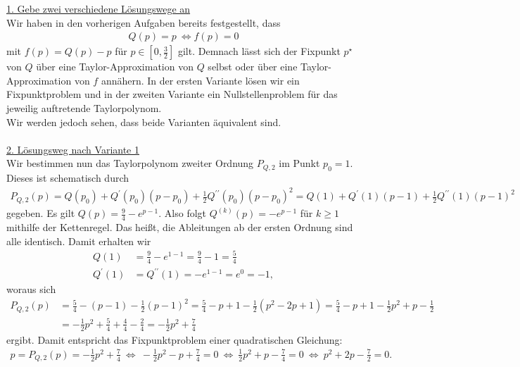 \underline{1. Gebe zwei verschiedene Lösungswege an}\\
Wir haben in den vorherigen Aufgaben bereits festgestellt, dass
\begin{align*}
	Q(p) = p \ \Leftrightarrow f(p) = 0
\end{align*}
mit $ f(p) = Q(p) - p  $ für $ p \in \left[0,\frac{3}{2}\right]   $ gilt.
Demnach lässt sich der Fixpunkt $ p^\star $ von $ Q $ über eine Taylor-Approximation von $ Q $  selbst oder über eine Taylor-Approximation von $ f $
annähern.
In der ersten Variante lösen wir ein Fixpunktproblem und in der zweiten Variante ein Nullstellenproblem für das jeweilig auftretende Taylorpolynom.\\
Wir werden jedoch sehen, dass beide Varianten äquivalent sind.\\
\\
\underline{2. Lösungsweg nach Variante 1}\\
Wir bestimmen nun das Taylorpolynom zweiter Ordnung $ P_{Q,2} $ im Punkt $ p_0 = 1 $.
Dieses ist schematisch durch
\begin{align*}
	P_{Q,2}(p)
	=
	Q(p_0) + Q^\prime(p_0)(p -p_0) + \frac{1}{2}Q^{\prime \prime}(p_0)(p-p_0)^2
	=
	Q(1)+ Q^\prime(1)(p -1) + \frac{1}{2}Q^{\prime \prime}(1)(p-1)^2
\end{align*}
gegeben. Es gilt $ Q(p) = \frac{9}{4} - e^{p-1} $.
Also folgt $ Q^{(k)}(p) = -e^{p-1} $ für $ k \geq 1 $ mithilfe der Kettenregel.
Das heißt, die Ableitungen ab der ersten Ordnung sind alle identisch.
Damit erhalten wir
\begin{align*}
	Q(1) &= \frac{9}{4} - e^{1-1} = \frac{9}{4} - 1 = \frac{5}{4}\\
	Q^\prime(1) &= Q^{\prime \prime}(1) =-  e^{1-1 } = e^0 =  - 1,
\end{align*}
woraus sich
\begin{align*}
	P_{Q,2}(p)
	&=
	\frac{5}{4} - (p - 1) - \frac{1}{2} (p - 1)^2 
	=
	\frac{5}{4} - p + 1 -\frac{1}{2}(p^2 - 2p +  1)
	=
	\frac{5}{4} - p + 1 - \frac{1}{2} p^2 + p - \frac{1}{2}\\
	&=
	- \frac{1}{2} p^2 + \frac{5}{4} + \frac{4}{4} - \frac{2}{4}
	=
	- \frac{1}{2} p^2 + \frac{7}{4} 
\end{align*}
ergibt. Damit entspricht das Fixpunktproblem einer quadratischen Gleichung:
\begin{align*}
	p = P_{Q,2}(p) = - \frac{1}{2} p^2 + \frac{7}{4} 
	\ \Leftrightarrow \
	- \frac{1}{2} p^2 - p  + \frac{7}{4} = 0
	\ \Leftrightarrow \
	\frac{1}{2} p^2 + p  - \frac{7}{4} = 0
	\ \Leftrightarrow \
	 p^2 + 2p  - \frac{7}{2} = 0.
\end{align*}
